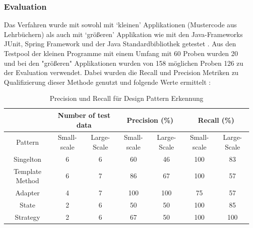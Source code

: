 \documentclass[conference]{IEEEtran}
\begin{document}
\subsubsection*{Evaluation}

Das Verfahren wurde mit sowohl mit `kleinen' Applikationen (Mustercode aus Lehrbüchern) als auch mit `größeren' Applikation wie mit den Java-Frameworks JUnit, Spring Framework und der Java Standardbibliothek getestet \cite[p. 7]{dodmetrics}.
Aus den Testpool der kleinen Programme mit einem Umfang mit 60 Proben wurden 20 und bei den "größeren" Applikationen wurden von 158 möglichen Proben 126 zu der Evaluation verwendet.
Dabei wurden die Recall und Precision Metriken zu Qualifizierung dieser Methode genutzt und folgende Werte ermittelt \cite[p. 8]{dodmetrics}:

\begin{table}
    \centering
    \caption{Precision und Recall für Design Pattern Erkennung}
    \label{table:2}
    \begin{tabular}{|c|c|c|c|c|c|c|}
        \hline
                        & \multicolumn{2}{|c|}{Number of test data} & \multicolumn{2}{|c|}{Precision (\%)} & \multicolumn{2}{|c|}{Recall (\%)}                                           \\
        \hline
        Pattern         & Small-scale                               & Large-Scale                          & Small-scale                       & Large-Scale & Small-scale & Large-Scale \\
        \hline
        Singelton       & 6                                         & 6                                    & 60                                & 46          & 100         & 83          \\
        \hline
        Template Method & 6                                         & 7                                    & 86                                & 67          & 100         & 57          \\
        \hline
        Adapter         & 4                                         & 7                                    & 100                               & 100         & 75          & 57          \\
        \hline
        State           & 2                                         & 6                                    & 50                                & 50          & 100         & 85          \\
        \hline
        Strategy        & 2                                         & 6                                    & 67                                & 50          & 100         & 100         \\
        \hline
    \end{tabular}
\end{table}
\end{document}
